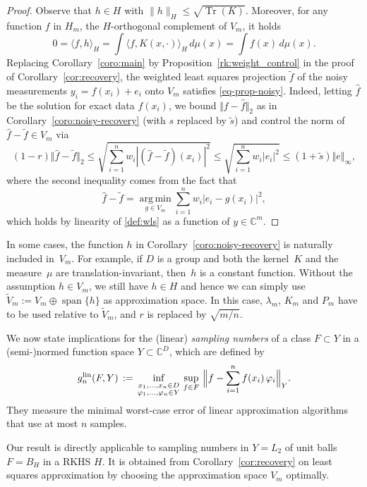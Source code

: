 \documentclass[a4paper,11pt]{article}
\renewcommand{\(}{\left (}
\renewcommand{\)}{\right )}
\newcommand{\<}{\langle}
\renewcommand{\>}{\rangle}
\renewcommand{\phi}{\varphi}
\newcommand{\C}{\mathbb{C}}
\theoremstyle{definition}
\DeclareMathOperator{\Span}{span}
\DeclareMathOperator{\Tr}{Tr}
\DeclareMathOperator*{\argmin}{arg\,min}
\begin{document}
\begin{proof}
Observe that $h\in H$ with $\|h\|_H\leq\sqrt{\Tr(K)}$. 
Moreover, for any function $f$ in $H_m$, the $H$-orthogonal complement of $V_m$, it holds
\[
0 = \<f,h\>_H = \int \<f,K(x,\cdot)\>_H\,d\mu(x) = \int f(x)\,d\mu(x).
\]
Replacing Corollary~\ref{coro:main} by Proposition~\ref{rk:weight_control} in the proof of Corollary~\ref{cor:recovery},
the weighted least squares projection $\tilde f$ of the noisy measurements $y_i=f(x_i)+e_i$ onto $V_m$ satisfies \eqref{eq-prop-noisy}.
Indeed, letting $\hat{f}$ be the solution for exact data $f(x_i)$, we bound 
$\Vert f - \hat{f}\Vert_2$ as in Corollary~\ref{coro:noisy-recovery}
(with $s$ replaced by $\tilde s$) and control the norm of 
$\hat{f} - \tilde f \in V_m$ via
\[
 (1-r)\Vert \hat{f} - \tilde f \Vert_2 
 \le \sqrt{\sum_{i=1}^n w_i |(\hat{f} - \tilde f)(x_i)|^2}
 \le \sqrt{\sum_{i=1}^n w_i |e_i|^2}
 \le (1+\tilde s) \Vert e \Vert_\infty,
\]
where the second inequality comes from the fact that
\[
\hat f - \tilde f = \argmin\limits_{g\in V_m} \sum_{i=1}^n w_i |e_i - g(x_i)|^2,
\]
which holds by linearity of \eqref{def:wls} as a function of $y \in \C^m$.
\end{proof}

\medskip

In some cases, the function $h$ in Corollary~\ref{coro:noisy-recovery} is naturally included in~$V_m$.
For example, if $D$ is a group and
both the kernel~$K$ and the measure~$\mu$ are 
translation-invariant, then~$h$ is a constant function. 
Without the assumption $h\in V_m$, we still have $h\in H$ and hence
we can simply use $\widetilde V_m := V_m\oplus \Span\{h\}$ as approximation space.
In this case, $\lambda_m$, $K_m$ and $P_m$ have to be used relative to $\widetilde V_m$, and $r$ is replaced by $\sqrt{m/n}$.


\medskip

We now state implications for the (linear) \emph{sampling numbers} of a class $F \subset Y$
in a (semi-)normed function space $Y \subset \C^D$, which are defined by 
\[
g_n^{\rm lin}(F,Y) 
\,:=\, 
\inf_{\substack{x_1,\dots,x_n\in D\\ \phi_1,\dots,\phi_n\in Y}}\, 
\sup_{f\in F}\, \Big\|f - \sum_{i=1}^n f(x_i) \, \phi_i\Big\|_{Y}.
\]
They measure the minimal worst-case error
of linear approximation algorithms that use at most $n$ samples.

Our result is directly applicable to sampling numbers in $Y=L_2$ of unit balls $F=B_H$ in a RKHS $H$.
It is obtained from Corollary~\ref{cor:recovery} on least squares approximation
by choosing the approximation space $V_m$ optimally.
\end{document}
